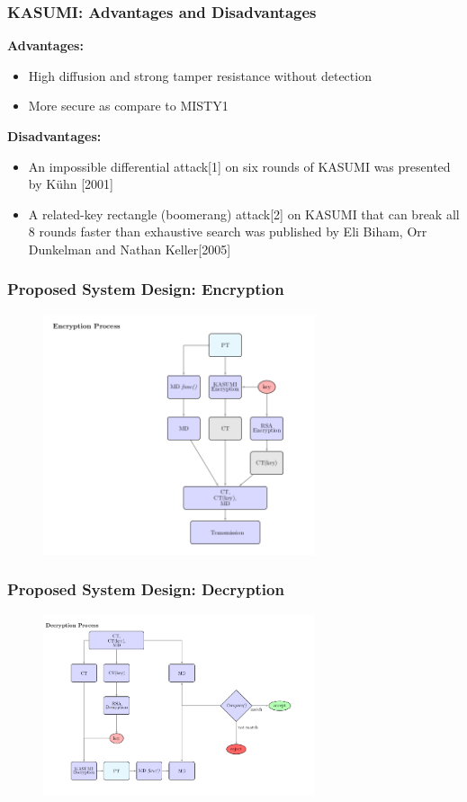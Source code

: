\documentclass{beamer}
\begin{document}
\begin{frame}[t]
	\frametitle{KASUMI: Advantages and Disadvantages}
	\textbf{Advantages: }
	\begin{itemize}
		\item High diffusion and strong tamper resistance without detection
		\item More secure as compare to MISTY1
	\end{itemize}
\textbf{Disadvantages: }
\begin{itemize}
	\item An impossible differential attack[1] on six rounds of KASUMI was presented by Kühn [2001]
	\item A related-key rectangle (boomerang) attack[2] on KASUMI that can break all 8 rounds faster than exhaustive search was published by Eli Biham, Orr Dunkelman and Nathan Keller[2005]
\end{itemize}
\end{frame}

\begin{frame}
	\frametitle{Proposed System Design: Encryption}
	\begin{figure}[h]
		\includegraphics[width=8cm]{enc}
	\end{figure}
\end{frame}
	
\begin{frame}
	\frametitle{Proposed System Design: Decryption}
	\begin{figure}[h]
		\includegraphics[width=8cm]{dec}
	\end{figure}
	
\end{frame}
\end{document}
